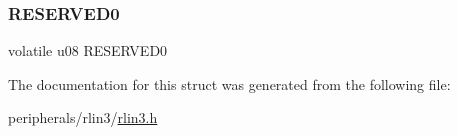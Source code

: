 \mbox{\label{structrlin3__lbfc__master_a59c0b30ccfb89f1b34e9682741859abd}} 
\subsubsection{\texorpdfstring{R\+E\+S\+E\+R\+V\+E\+D0}{RESERVED0}}
{\footnotesize\ttfamily volatile u08 R\+E\+S\+E\+R\+V\+E\+D0}



The documentation for this struct was generated from the following file\+:\begin{DoxyCompactItemize}
\item 
peripherals/rlin3/\mbox{\hyperlink{rlin3_8h}{rlin3.\+h}}\end{DoxyCompactItemize}
